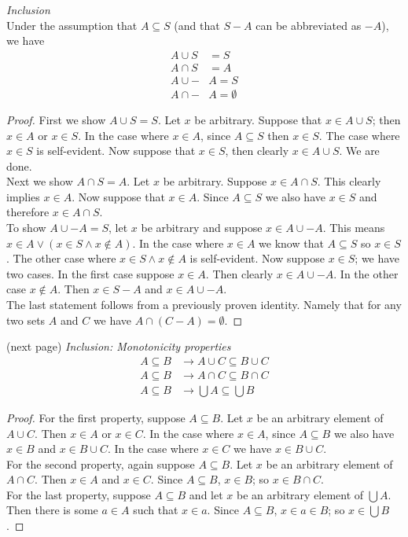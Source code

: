 \documentclass{report}
\begin{document}
\noindent\textit{Inclusion}\\
Under the assumption that $A\subseteq S$ (and that $S-A$ can be abbreviated as $-A$), we have
\begin{align*}
A\cup S&=S\\
A\cap S&=A\\
A\cup-&A=S\\
A\cap-&A=\emptyset
\end{align*}
\begin{proof}
First we show $A\cup S=S$. Let $x$ be arbitrary. Suppose that $x\in A\cup S$; then $x\in A$ or $x\in S$. In the case where $x\in A$, since $A\subseteq S$ then $x\in S$. The case where $x\in S$ is 
self-evident. Now suppose that $x\in S$, then clearly $x\in A\cup S$. We are done.\\
\indent Next we show $A\cap S=A$. Let $x$ be arbitrary. Suppose $x\in A\cap S$. This clearly implies $x\in A$. Now suppose that $x\in A$. Since $A\subseteq S$ we also have $x\in S$ and therefore 
$x\in A\cap S$.\\
\indent To show $A\cup-A=S$, let $x$ be arbitrary and suppose $x\in A\cup -A$. This means
$x\in A\lor(x\in S\land x\notin A)$. In the case where $x\in A$ we know that $A\subseteq S$ so $x\in S$. The other case where $x\in S\land x\notin A$ is self-evident. Now suppose $x\in S$; we have 
two cases. In the first case suppose $x\in A$. Then clearly $x\in A\cup-A$. In the other case $x\notin A$. Then $x\in S-A$ and $x\in A\cup-A$.\\
\indent The last statement follows from a previously proven identity. Namely that for any two sets $A$ and $C$ we have $A\cap(C-A)=\emptyset$.
\end{proof}
\noindent(next page)\newpage
\noindent\textit{Inclusion: Monotonicity properties}
\begin{align*}
A\subseteq B&\to A\cup C\subseteq B\cup C\\
A\subseteq B&\to A\cap C\subseteq B\cap C\\
A\subseteq B&\to\bigcup A\subseteq\bigcup B
\end{align*}
\begin{proof}
For the first property, suppose $A\subseteq B$. Let $x$ be an arbitrary element of $A\cup C$. Then $x\in A$ or $x\in C$. In the case where $x\in A$, since $A\subseteq B$ we also have $x\in B$ and 
$x\in B\cup C$. 
In the case where $x\in C$ we have $x\in B\cup C$.\\
\indent For the second property, again suppose $A\subseteq B$. Let $x$ be an arbitrary element of $A\cap C$. Then $x\in A$ and $x\in C$. Since $A\subseteq B$, $x\in B$; so $x\in B\cap C$.\\
\indent For the last property, suppose $A\subseteq B$ and let $x$ be an arbitrary element of $\bigcup A$. Then there is some $a\in A$ such that $x\in a$. Since $A\subseteq B$, $x\in a\in B$; so
$x\in\bigcup B$.
\end{proof}
\end{document}
